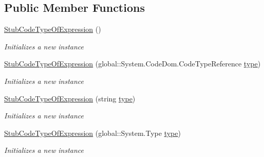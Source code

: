 \subsection*{Public Member Functions}
\begin{DoxyCompactItemize}
\item 
\hyperlink{class_system_1_1_code_dom_1_1_fakes_1_1_stub_code_type_of_expression_a7bb9b901f8e32e8e050f74f2fa9a53ac}{Stub\-Code\-Type\-Of\-Expression} ()
\begin{DoxyCompactList}\small\item\em Initializes a new instance\end{DoxyCompactList}\item 
\hyperlink{class_system_1_1_code_dom_1_1_fakes_1_1_stub_code_type_of_expression_a9c6ac5d14adf75cfb21781b26e53d2bd}{Stub\-Code\-Type\-Of\-Expression} (global\-::\-System.\-Code\-Dom.\-Code\-Type\-Reference \hyperlink{jquery-1_810_82-vsdoc_8js_a3940565e83a9bfd10d95ffd27536da91}{type})
\begin{DoxyCompactList}\small\item\em Initializes a new instance\end{DoxyCompactList}\item 
\hyperlink{class_system_1_1_code_dom_1_1_fakes_1_1_stub_code_type_of_expression_a415b960786852ee84a3db382ef9e58f0}{Stub\-Code\-Type\-Of\-Expression} (string \hyperlink{jquery-1_810_82-vsdoc_8js_a3940565e83a9bfd10d95ffd27536da91}{type})
\begin{DoxyCompactList}\small\item\em Initializes a new instance\end{DoxyCompactList}\item 
\hyperlink{class_system_1_1_code_dom_1_1_fakes_1_1_stub_code_type_of_expression_a53308bb2d2b6e51273b0a84e6e44402e}{Stub\-Code\-Type\-Of\-Expression} (global\-::\-System.\-Type \hyperlink{jquery-1_810_82-vsdoc_8js_a3940565e83a9bfd10d95ffd27536da91}{type})
\begin{DoxyCompactList}\small\item\em Initializes a new instance\end{DoxyCompactList}\end{DoxyCompactItemize}
